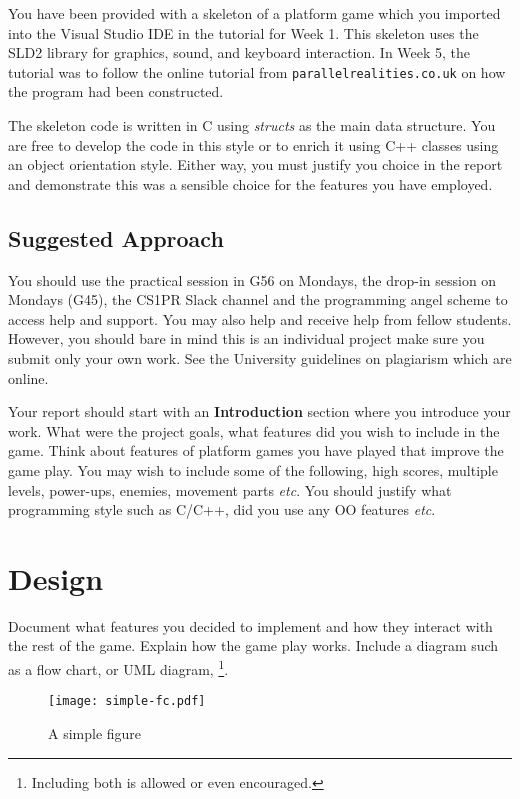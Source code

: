 You have been provided with a skeleton of a platform game which you
imported into the Visual Studio IDE in the tutorial for Week 1.
This skeleton uses the SLD2 library for graphics, sound, and keyboard interaction.
In Week 5, the tutorial was to follow the online tutorial from {\texttt{parallelrealities.co.uk}} on how the program had been constructed.

The skeleton code is written in C using {\em structs} as the main
data structure. You are free to develop the code in this style or to enrich it using C++ classes using an object orientation style.
Either way, you must justify you choice in the report and demonstrate this was
a sensible choice for the features you have employed.

\subsection{Suggested Approach}

You should use the practical session in G56 on Mondays, the drop-in
session on Mondays (G45), the CS1PR Slack channel and the programming
angel scheme to access help and support.
You may also help and receive
help from fellow students.
However, you should bare in mind this is an individual project make sure you submit only your own work.
See the University guidelines on plagiarism which are online.  

Your report should start with an {\textbf{Introduction}} section where
you introduce your work. What were the project goals, what features
did you wish to include in the game. Think about features of platform games you have played that
improve the game play. You may wish to include some of the following,
high scores, multiple levels, power-ups, enemies, movement parts
{\em etc}. 
You should justify what
programming style such as C/C++, did you use any OO features {\em etc}.

\section{Design}
Document what features you decided to implement and how they interact with
the rest of the game. Explain how the game play works.  
Include a diagram such as a flow
chart,  or UML diagram, \footnote{Including
  both is allowed or even encouraged.}.

\begin{figure}[H]
\centering\texttt{[image: simple-fc.pdf]}
\caption{\label{fig:fc}A simple figure}
\end{figure}


